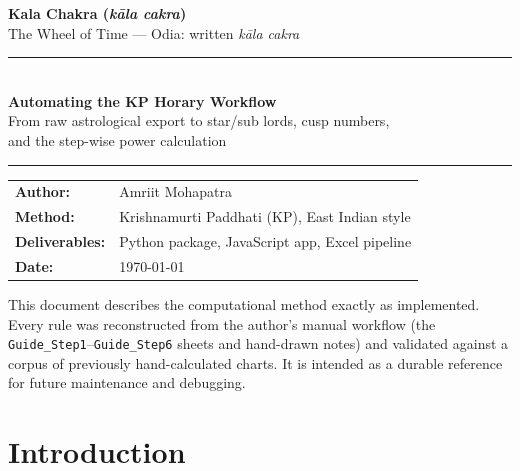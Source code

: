 \documentclass[11pt, a4paper]{article}
\newcommand{\code}[1]{\texttt{#1}}
\begin{document}

\begin{titlepage}
  \centering
  \vspace*{1.6cm}
  {\Large\bfseries\color{headerblue} Kala Chakra \quad(\textnormal{\itshape k\=ala cakra})}\\[0.4em]
  {\normalsize The Wheel of Time --- Odia: written \textit{k\=ala cakra}}
  \vspace{1.3cm}

  \rule{\textwidth}{1.5pt}\\[0.5em]
  {\LARGE\bfseries Automating the KP Horary Workflow}\\[0.4em]
  {\large From raw astrological export to star/sub lords, cusp numbers,\\
   and the step-wise power calculation}\\
  \rule{\textwidth}{1.5pt}
  \vspace{1.3cm}

  \begin{tabular}{ll}
    \textbf{Author:}   & Amriit Mohapatra \\
    \textbf{Method:}   & Krishnamurti Paddhati (KP), East Indian style \\
    \textbf{Deliverables:} & Python package, JavaScript app, Excel pipeline \\
    \textbf{Date:}     & \today \\
  \end{tabular}
  \vfill

  \begin{notebox}
  \small This document describes the computational method exactly as
  implemented. Every rule was reconstructed from the author's manual
  workflow (the \code{Guide\_Step1}--\code{Guide\_Step6} sheets and hand-drawn
  notes) and validated against a corpus of previously hand-calculated
  charts. It is intended as a durable reference for future maintenance and
  debugging.
  \end{notebox}
\end{titlepage}

\tableofcontents
\newpage

\section{Introduction}
\end{document}
